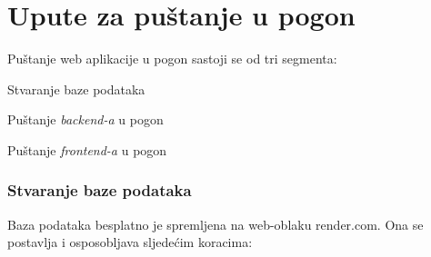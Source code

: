 		\section{Upute za puštanje u pogon}
		
			Puštanje web aplikacije u pogon sastoji se od tri segmenta:

			\begin{packed_item}
				\item Stvaranje baze podataka
				\item Puštanje \textit{backend-a} u pogon
				\item Puštanje \textit{frontend-a} u pogon
			\end{packed_item}

			\subsubsection{Stvaranje baze podataka}

			Baza podataka besplatno je spremljena na web-oblaku render.com. 
			Ona se postavlja i osposobljava sljedećim koracima:

